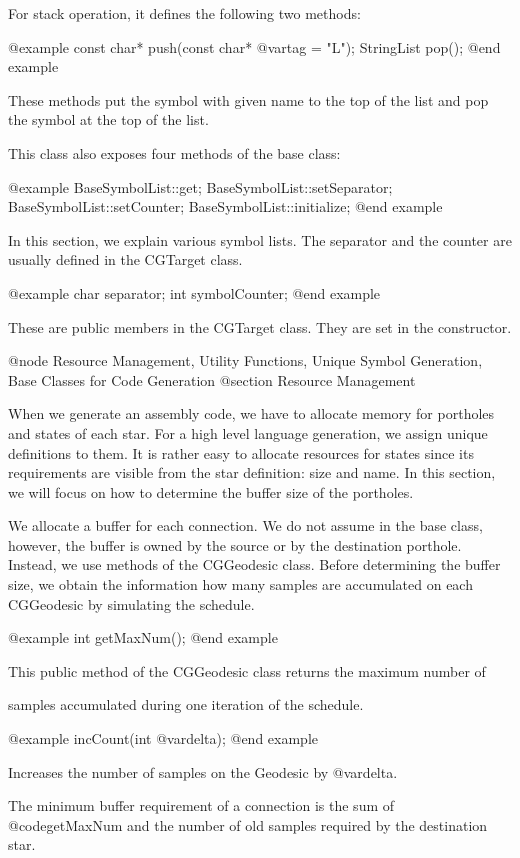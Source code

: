 For stack operation, it defines the following two methods:

@example
const char* push(const char* @var{tag} = "L");
StringList pop();
@end example

These methods put the symbol with given name to the top of the list and
pop the symbol at the top of the list.

This class also exposes four methods of the base class:

@example
BaseSymbolList::get;
BaseSymbolList::setSeparator;
BaseSymbolList::setCounter;
BaseSymbolList::initialize;
@end example

In this section, we explain various symbol lists. The separator and the
counter are usually defined in the CGTarget class.

@example
char separator;
int symbolCounter;
@end example

These are public members in the CGTarget class. They are set in the
constructor.

@node Resource Management, Utility Functions, Unique Symbol Generation, Base Classes for Code Generation
@section Resource Management

When we generate an assembly code, we have to allocate memory for portholes
and states of each star. For a high level language generation, we assign
unique definitions to them. It is rather easy to allocate resources for states
since its requirements are visible from the star definition: size and
name. In this section, we will focus on how to determine the buffer 
size of the portholes.

We allocate a buffer for each connection. We do not assume in the base class,
however, the buffer is owned by the source or by the destination porthole.
Instead, we use methods of the CGGeodesic class. Before determining the buffer
size, we obtain the information how many samples are accumulated on each
CGGeodesic by simulating the schedule. 

@example
int getMaxNum();
@end example

This public method of the CGGeodesic class returns the maximum number of

samples accumulated during one iteration of the schedule.

@example
incCount(int @var{delta});
@end example

Increases the number of samples on the Geodesic by @var{delta}.

The minimum buffer requirement of a connection is the sum of 
@code{getMaxNum} and the number of old samples required
by the destination star.

